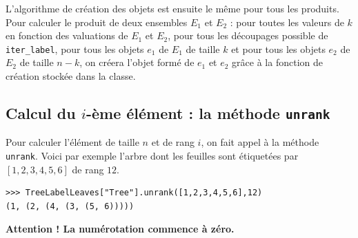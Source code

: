\documentclass[11pt]{article}
\begin{document}
L'algorithme de création des objets est ensuite le même pour tous les produits. 
Pour calculer le produit de deux ensembles $E_1$ et $E_2$ : pour toutes les valeurs
de $k$ en fonction des valuations de $E_1$ et $E_2$, pour tous les découpages possible 
de {\tt iter\_label}, pour tous les objets $e_1$ de $E_1$ de taille $k$ et pour tous
les objets $e_2$ de $E_2$ de taille $n-k$, on créera l'objet formé de $e_1$ et $e_2$
grâce à la fonction de création stockée dans la classe.



\subsection{Calcul du $i$-ème élément : la méthode \texttt{unrank}}

Pour calculer l'élément de taille $n$ et de rang $i$, on fait appel à la
méthode \texttt{unrank}. Voici par exemple l'arbre dont les feuilles
sont étiquetées par $[1,2,3,4,5,6]$ de rang $12$.
\begin{verbatim}
>>> TreeLabelLeaves["Tree"].unrank([1,2,3,4,5,6],12)
(1, (2, (4, (3, (5, 6)))))
\end{verbatim}
\textbf{Attention ! La numérotation commence à zéro.}
\end{document}
